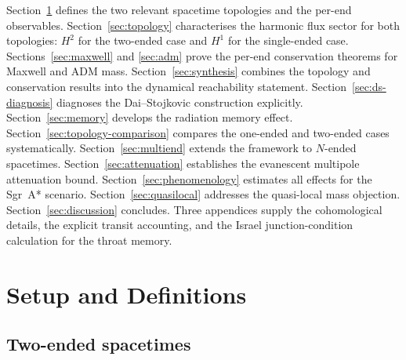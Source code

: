 \documentclass[aps,prd,onecolumn,nofootinbib,superscriptaddress]{revtex4-2}
\begin{document}
Section~\ref{sec:setup} defines the two relevant spacetime topologies and the
per-end observables.  Section~\ref{sec:topology} characterises the harmonic
flux sector for both topologies: $H^2$ for the two-ended case and $H^1$ for
the single-ended case.  Sections~\ref{sec:maxwell} and \ref{sec:adm} prove the
per-end conservation theorems for Maxwell and ADM mass.
Section~\ref{sec:synthesis} combines the topology and conservation results into
the dynamical reachability statement.  Section~\ref{sec:ds-diagnosis}
diagnoses the Dai--Stojkovic construction explicitly.
Section~\ref{sec:memory} develops the radiation memory effect.
Section~\ref{sec:topology-comparison} compares the one-ended and two-ended
cases systematically.  Section~\ref{sec:multiend} extends the framework to
$N$-ended spacetimes.  Section~\ref{sec:attenuation} establishes the
evanescent multipole attenuation bound.  Section~\ref{sec:phenomenology}
estimates all effects for the Sgr~A* scenario.
Section~\ref{sec:quasilocal} addresses the quasi-local mass objection.
Section~\ref{sec:discussion} concludes.  Three appendices supply the
cohomological details, the explicit transit accounting, and the Israel
junction-condition calculation for the throat memory.

\section{Setup and Definitions}
\label{sec:setup}

\subsection{Two-ended spacetimes}
\end{document}
